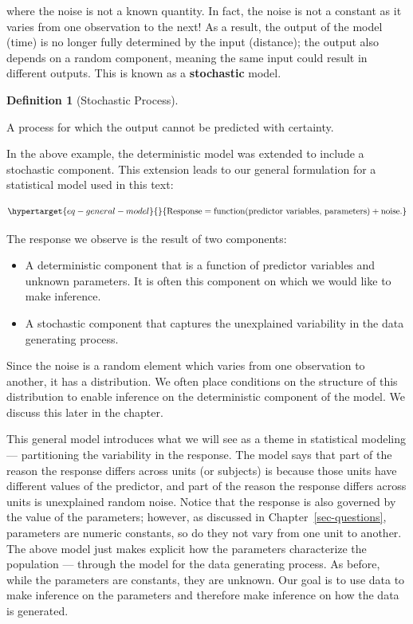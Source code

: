 \documentclass[
  letterpaper,
  DIV=11,
  numbers=noendperiod]{scrreprt}
\providecommand{\tightlist}{%
  \setlength{\itemsep}{0pt}\setlength{\parskip}{0pt}}\usepackage{longtable,booktabs,array}
\theoremstyle{definition}
\newtheorem{definition}{Definition}[chapter]
\theoremstyle{definition}
\theoremstyle{plain}
\theoremstyle{remark}
\begin{document}
where the noise is not a known quantity. In fact, the noise is not a
constant as it varies from one observation to the next! As a result, the
output of the model (time) is no longer fully determined by the input
(distance); the output also depends on a random component, meaning the
same input could result in different outputs. This is known as a
\textbf{stochastic} model.

\begin{definition}[Stochastic
Process]\protect\hypertarget{def-stochastic-process}{}\label{def-stochastic-process}

A process for which the output cannot be predicted with certainty.

\end{definition}

In the above example, the deterministic model was extended to include a
stochastic component. This extension leads to our general formulation
for a statistical model used in this text:

\begin{equation}\protect\hypertarget{eq-general-model}{}{
\text{Response} = \text{function}(\text{predictor variables, parameters}) + \text{noise}.
}\label{eq-general-model}\end{equation}

The response we observe is the result of two components:

\begin{itemize}
\tightlist
\item
  A deterministic component that is a function of predictor variables
  and unknown parameters. It is often this component on which we would
  like to make inference.
\item
  A stochastic component that captures the unexplained variability in
  the data generating process.
\end{itemize}

Since the noise is a random element which varies from one observation to
another, it has a distribution. We often place conditions on the
structure of this distribution to enable inference on the deterministic
component of the model. We discuss this later in the chapter.

This general model introduces what we will see as a theme in statistical
modeling --- partitioning the variability in the response. The model
says that part of the reason the response differs across units (or
subjects) is because those units have different values of the predictor,
and part of the reason the response differs across units is unexplained
random noise. Notice that the response is also governed by the value of
the parameters; however, as discussed in Chapter~\ref{sec-questions},
parameters are numeric constants, so do they not vary from one unit to
another. The above model just makes explicit how the parameters
characterize the population --- through the model for the data
generating process. As before, while the parameters are constants, they
are unknown. Our goal is to use data to make inference on the parameters
and therefore make inference on how the data is generated.
\end{document}
